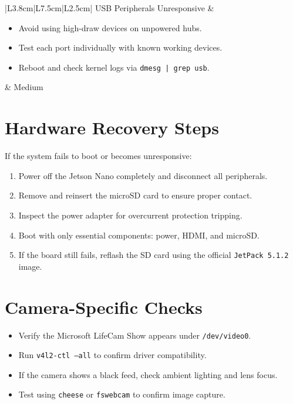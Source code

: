 \begin{table}[H]
\begin{tabular}{|L{3.8cm}|L{7.5cm}|L{2.5cm}|}
		USB Peripherals Unresponsive & 
		\begin{itemize}[leftmargin=*]
			\item Avoid using high-draw devices on unpowered hubs.  
			\item Test each port individually with known working devices.  
			\item Reboot and check kernel logs via \texttt{dmesg | grep usb}.  
		\end{itemize} & Medium \\ \hline
		
	\end{tabular}
\end{table}

\section{Hardware Recovery Steps}

If the system fails to boot or becomes unresponsive:
\begin{enumerate}
	\item Power off the Jetson Nano completely and disconnect all peripherals.
	\item Remove and reinsert the microSD card to ensure proper contact.
	\item Inspect the power adapter for overcurrent protection tripping.
	\item Boot with only essential components: power, HDMI, and microSD.
	\item If the board still fails, reflash the SD card using the official \texttt{JetPack~5.1.2} image.
\end{enumerate}

\section{Camera-Specific Checks}

\begin{itemize}
	\item Verify the Microsoft LifeCam Show appears under \texttt{/dev/video0}.  
	\item Run \texttt{v4l2-ctl --all} to confirm driver compatibility.  
	\item If the camera shows a black feed, check ambient lighting and lens focus.  
	\item Test using \texttt{cheese} or \texttt{fswebcam} to confirm image capture.  
\end{itemize}

